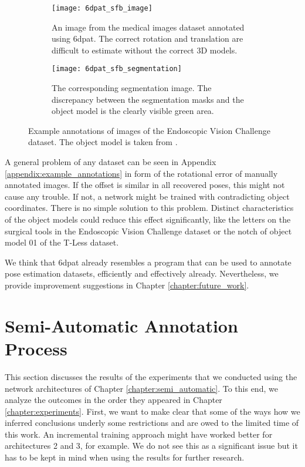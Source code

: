 \begin{figure}
	\begin{subfigure}[t]{0.47\textwidth}
		\centering
    	\texttt{[image: 6dpat\_sfb\_image]}
    	\caption{An image from the medical images dataset annotated using \ac{6dpat}. The correct rotation and translation are difficult to estimate without the correct 3D models.}
    	\label{fig:6dpat_sfb_image}
	\end{subfigure} 
	\hfill
	\begin{subfigure}[t]{0.47\textwidth}
		\centering
    	\texttt{[image: 6dpat\_sfb\_segmentation]}
    	\caption{The corresponding segmentation image. The discrepancy between the segmentation masks and the object model is the clearly visible green area.}
    	\label{fig:6dpat_sfb_segmentation}
	\end{subfigure} 
	\caption{Example annotations of images of the Endoscopic Vision Challenge dataset. The object model is taken from \cite{3d_scalpel_online}.}
	\label{fig:6dpat_sfb}
\end{figure} 

A general problem of any dataset can be seen in Appendix \ref{appendix:example_annotations} in form of the rotational error of manually annotated images. If the offset is similar in all recovered poses, this might not cause any trouble. If not, a network might be trained with contradicting object coordinates. There is no simple solution to this problem. Distinct characteristics of the object models could reduce this effect significantly, like the letters on the surgical tools in the Endoscopic Vision Challenge dataset or the notch of object model 01 of the T-Less dataset.

We think that \ac{6dpat} already resembles a program that can be used to annotate pose estimation datasets, efficiently and effectively already. Nevertheless, we provide improvement suggestions in Chapter \ref{chapter:future_work}.

\section{Semi-Automatic Annotation Process}

This section discusses the results of the experiments that we conducted using the network architectures of Chapter \ref{chapter:semi_automatic}. To this end, we analyze the outcomes in the order they appeared in Chapter \ref{chapter:experiments}. First, we want to make clear that some of the ways how we inferred conclusions underly some restrictions and are owed to the limited time of this work. An incremental training approach might have worked better for architectures 2 and 3, for example. We do not see this as a significant issue but it has to be kept in mind when using the results for further research.

